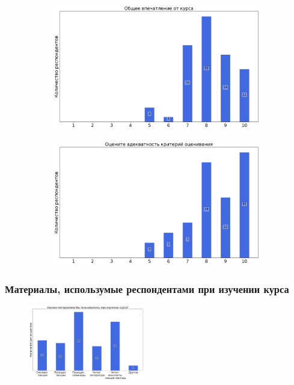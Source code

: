 		\begin{figure}[H]
			\centering
			\begin{subfigure}[b]{0.45\textwidth}
				\centering
				\includegraphics[width=\textwidth]{images/3 course/ТФКП/general-0.png}
			\end{subfigure}
			\begin{subfigure}[b]{0.45\textwidth}
				\centering
				\includegraphics[width=\textwidth]{images/3 course/ТФКП/general-1.png}
			\end{subfigure}	
		\end{figure}

	\subsubsection{Материалы, использумые респондентами при изучении курса}

		\begin{figure}[H]
			\centering
			\includegraphics[width = 0.45\textwidth]{images/3 course/ТФКП/materials.png}
		\end{figure}

